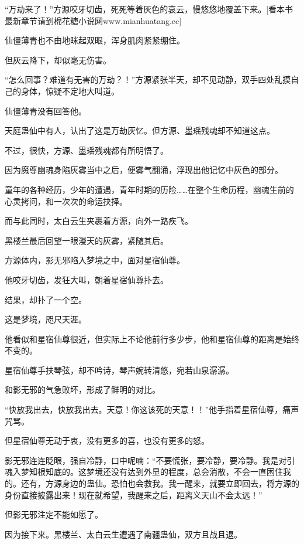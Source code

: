 
\begin{this_body}

“万劫来了！”方源咬牙切齿，死死等着灰色的哀云，慢悠悠地覆盖下来。[看本书最新章节请到棉花糖小说网www.mianhuatang.cc]

仙僵薄青也不由地眯起双眼，浑身肌肉紧紧绷住。

但灰云降下，却似毫无伤害。

“怎么回事？难道有无害的万劫？！”方源紧张半天，却不见动静，双手四处乱摸自己的身体，惊疑不定地大叫道。

仙僵薄青没有回答他。

天庭蛊仙中有人，认出了这是万劫灰忆。但方源、墨瑶残魂却不知道这点。

不过，很快，方源、墨瑶残魂都有所明悟了。

因为魔尊幽魂身陷灰雾当中之后，便雾气翻涌，浮现出他记忆中灰色的部分。

童年的各种经历，少年的遭遇，青年时期的历险……在整个生命历程，幽魂生前的心灵拷问，和一次次的命运抉择。

而与此同时，太白云生夹裹着方源，向外一路疾飞。

黑楼兰最后回望一眼漫天的灰雾，紧随其后。

方源体内，影无邪陷入梦境之中，面对星宿仙尊。

他咬牙切齿，发狂大叫，朝着星宿仙尊扑去。

结果，却扑了一个空。

这是梦境，咫尺天涯。

他看似和星宿仙尊很近，但实际上不论他前行多少步，他和星宿仙尊的距离是始终不变的。

星宿仙尊手扶琴弦，却不吟诗，琴声婉转清悠，宛若山泉潺潺。

和影无邪的气急败坏，形成了鲜明的对比。

“快放我出去，快放我出去。天意！你这该死的天意！！”他手指着星宿仙尊，痛声咒骂。

但星宿仙尊无动于衷，没有更多的喜，也没有更多的怒。

影无邪连连眨眼，强自冷静，口中呢喃：“不要慌张，要冷静，要冷静。我是对引魂入梦知根知底的。这梦境还没有达到外显的程度，总会消散，不会一直困住我的。还有，方源身边的蛊仙。恐怕也会救我。我一醒来，就要立即回去，将方源的身份直接披露出来！现在就希望，我醒来之后，距离义天山不会太远！”

但影无邪注定不能如愿了。

因为接下来。黑楼兰、太白云生遭遇了南疆蛊仙，双方且战且退。


\end{this_body}
